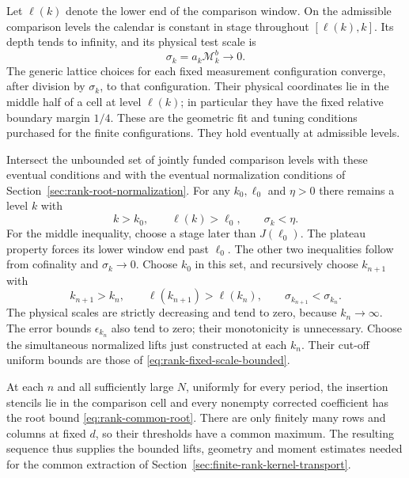 Let $\ell(k)$ denote the lower end of the comparison window. On the
admissible comparison levels the calendar is constant in stage throughout
$[\ell(k),k]$. Its depth tends to infinity, and its physical test scale is
\[
                       \sigma_k=a_k\mathcal M_k^b\longrightarrow0.
\]
The generic lattice choices for each fixed measurement configuration
converge, after division by $\sigma_k$, to that configuration. Their
physical coordinates lie in the middle half of a cell at level $\ell(k)$;
in particular they have the fixed relative boundary margin $1/4$.
These are the geometric fit and tuning conditions purchased for the
finite configurations. They hold eventually at admissible levels.

Intersect the unbounded set of jointly funded comparison levels with
these eventual conditions and with the eventual normalization conditions
of Section~\ref{sec:rank-root-normalization}. For any $k_0,\ell_0$ and
$\eta>0$ there remains a level $k$ with
\[
                  k>k_0,\qquad \ell(k)>\ell_0,
                  \qquad \sigma_k<\eta.
\]
For the middle inequality, choose a stage later than $J(\ell_0)$.
The plateau property forces its lower window end past $\ell_0$.
The other two inequalities follow from cofinality and $\sigma_k\to0$.
Choose $k_0$ in this set, and recursively choose $k_{n+1}$ with
\[
 k_{n+1}>k_n,\qquad \ell(k_{n+1})>\ell(k_n),
                      \qquad \sigma_{k_{n+1}}<\sigma_{k_n}.
\]
The physical scales are strictly decreasing and tend to zero, because
$k_n\to\infty$. The error bounds $\epsilon_{k_n}$ also tend to zero;
their monotonicity is unnecessary. Choose the simultaneous normalized
lifts just constructed at each $k_n$. Their cut-off uniform bounds are
those of \eqref{eq:rank-fixed-scale-bounded}.

At each $n$ and all sufficiently large $N$, uniformly for every period,
the insertion stencils lie in the comparison cell and every nonempty
corrected coefficient has the root bound \eqref{eq:rank-common-root}.
There are only finitely many rows and columns at fixed $d$, so their
thresholds have a common maximum. The resulting sequence thus supplies
the bounded lifts, geometry and moment estimates needed for the common
extraction of Section~\ref{sec:finite-rank-kernel-transport}.

